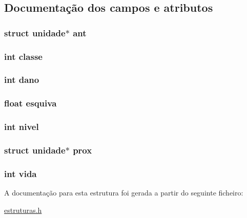\subsection{\-Documentação dos campos e atributos}
\hypertarget{structunidade_ae95a7a2ca6d4e4458fa7775580a3b304}{
\subsubsection[{ant}]{\setlength{\rightskip}{0pt plus 5cm}struct {\bf unidade}$\ast$ {\bf ant}}}\label{structunidade_ae95a7a2ca6d4e4458fa7775580a3b304}
\hypertarget{structunidade_a6dba0a17b4b24adfd8eef72687d3f0da}{
\subsubsection[{classe}]{\setlength{\rightskip}{0pt plus 5cm}int {\bf classe}}}\label{structunidade_a6dba0a17b4b24adfd8eef72687d3f0da}
\hypertarget{structunidade_a8f9411cc7c2f4b7a3800e807ea85e606}{
\subsubsection[{dano}]{\setlength{\rightskip}{0pt plus 5cm}int {\bf dano}}}\label{structunidade_a8f9411cc7c2f4b7a3800e807ea85e606}
\hypertarget{structunidade_ace4fd16342645758350afa447a9827e5}{
\subsubsection[{esquiva}]{\setlength{\rightskip}{0pt plus 5cm}float {\bf esquiva}}}\label{structunidade_ace4fd16342645758350afa447a9827e5}
\hypertarget{structunidade_afafcd32854d6f6b1c4cd3cca8f1315a7}{
\subsubsection[{nivel}]{\setlength{\rightskip}{0pt plus 5cm}int {\bf nivel}}}\label{structunidade_afafcd32854d6f6b1c4cd3cca8f1315a7}
\hypertarget{structunidade_a7f4ce5c1013e03c4e99c3772904235e5}{
\subsubsection[{prox}]{\setlength{\rightskip}{0pt plus 5cm}struct {\bf unidade}$\ast$ {\bf prox}}}\label{structunidade_a7f4ce5c1013e03c4e99c3772904235e5}
\hypertarget{structunidade_a5ad38abe22f6739f387e4653850ed5ee}{
\subsubsection[{vida}]{\setlength{\rightskip}{0pt plus 5cm}int {\bf vida}}}\label{structunidade_a5ad38abe22f6739f387e4653850ed5ee}


\-A documentação para esta estrutura foi gerada a partir do seguinte ficheiro\-:\begin{DoxyCompactItemize}
\item 
\hyperlink{estruturas_8h}{estruturas.\-h}\end{DoxyCompactItemize}
